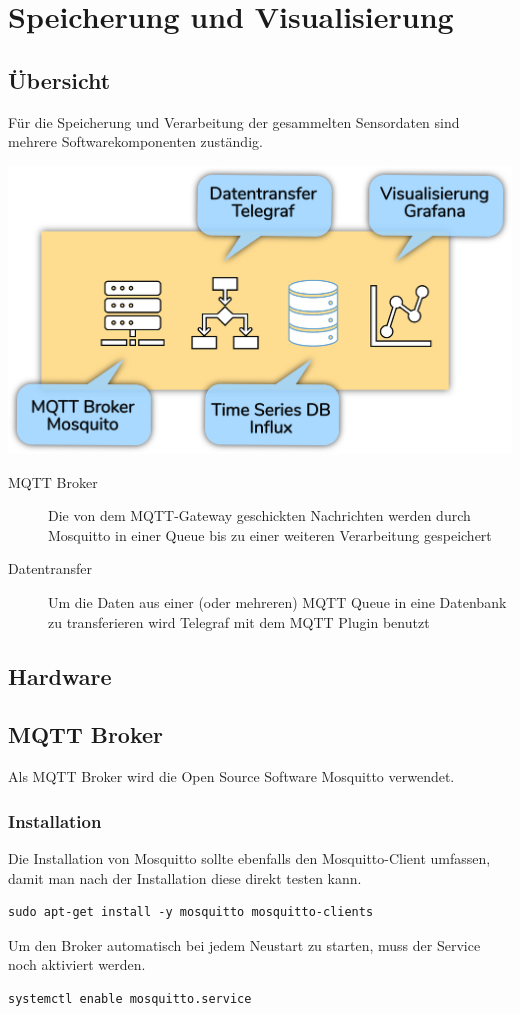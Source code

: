 \documentclass[
  12pt, %
  a4paper, %
  twoside, %
  openany, %
  numbers=noenddot, %
  BCOR=5mm, %
  parskip=half*, %
  thesis, %
]{bfhbook}
\begin{document}
\chapter{Speicherung und Visualisierung}
\section{Übersicht}
Für die Speicherung und Verarbeitung der gesammelten Sensordaten sind mehrere Softwarekomponenten zuständig.
\begin{center}
\includegraphics[width=17cm, left]{Bilder/Raspberry-Software.png}%
\label{labelname}%
\end{center}
 \begin{description}
\item[MQTT Broker] Die von dem MQTT-Gateway geschickten Nachrichten werden durch Mosquitto \cite{mosquitto} in einer Queue bis zu einer weiteren Verarbeitung gespeichert
\item[Datentransfer] Um die Daten aus einer (oder mehreren) MQTT Queue in eine Datenbank zu transferieren wird Telegraf \cite{telegraf} mit dem MQTT Plugin benutzt \cite{telegrafmqtt}
\end{description}
\section{Hardware}
\section{MQTT Broker}
Als MQTT Broker wird die Open Source Software Mosquitto \cite{mosquitto} verwendet.
\subsection{Installation}
Die Installation von Mosquitto sollte ebenfalls den Mosquitto-Client umfassen, damit man nach der Installation diese direkt testen kann.
\begin{verbatim}
sudo apt-get install -y mosquitto mosquitto-clients
   \end{verbatim}
 Um den Broker automatisch bei jedem Neustart zu starten, muss der Service noch aktiviert werden.
 \begin{verbatim}
systemctl enable mosquitto.service
 \end{verbatim}
\end{document}
